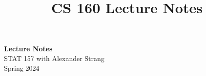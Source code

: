 \documentclass[11pt]{article}
\begin{document}
    \title{CS 160 Lecture Notes}
    
    \thispagestyle{empty}

    \begin{center}
    {\LARGE \bf Lecture Notes}\\
    {\large STAT 157 with Alexander Strang}\\
    Spring 2024
    \end{center}
    
    \tableofcontents

     
    
    
    
    
    
    
    
    
    
    
    
    
%     
%     

%     
%     
\end{document}
